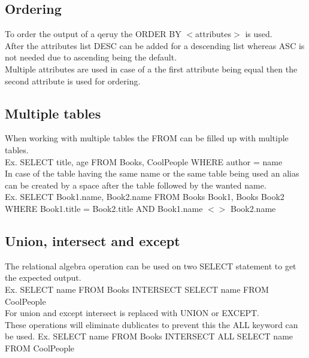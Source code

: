 \documentclass[12pt, a4paper]{article}
\begin{document}
		\subsection{Ordering}
			To order the output of a qeruy the ORDER BY $<$attributes$>$ is used.\\
			After the attributes list DESC can be added for a descending list whereas ASC is not needed due to ascending being the default.\\
			Multiple attributes are used in case of a the first attribute being equal then the second attribute is used for ordering.
		\subsection{Multiple tables}
			When working with multiple tables the FROM can be filled up with multiple tables.\\
			Ex. SELECT title, age FROM Books, CoolPeople WHERE author = name\\
			In case of the table having the same name or the same table being used an alias can be created by a space after the table followed by the wanted name.\\
			Ex. SELECT Book1.name, Book2.name FROM Books Book1, Books Book2 WHERE Book1.title = Book2.title AND Book1.name $<>$ Book2.name\\
		\subsection{Union, intersect and except}
			The relational algebra operation can be used on two SELECT statement to get the expected output.\\
			Ex. SELECT name FROM Books INTERSECT SELECT name FROM CoolPeople\\
			For union and except intersect is replaced with UNION or EXCEPT.\\
			These operations will eliminate dublicates to prevent this the ALL keyword can be used. Ex. SELECT name FROM Books INTERSECT ALL SELECT name FROM CoolPeople\\
\end{document}
